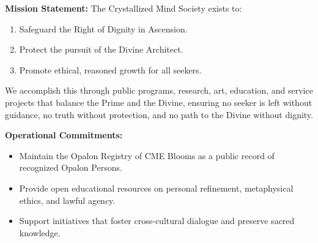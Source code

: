 \medskip

\noindent
\textbf{Mission Statement:}
The Crystallized Mind Society exists to:
\begin{enumerate}
    \item Safeguard the Right of Dignity in Ascension.
    \item Protect the pursuit of the Divine Architect.
    \item Promote ethical, reasoned growth for all seekers.
\end{enumerate}
We accomplish this through public programs, research, art, education, and service projects that balance the Prime and the Divine, ensuring no seeker is left without guidance, no truth without protection, and no path to the Divine without dignity.

\medskip

\noindent
\textbf{Operational Commitments:}
\begin{itemize}
    \item Maintain the Opalon Registry of CME Blooms as a public record of recognized Opalon Persons.
    \item Provide open educational resources on personal refinement, metaphysical ethics, and lawful agency.
    \item Support initiatives that foster cross-cultural dialogue and preserve sacred knowledge.
\end{itemize}

